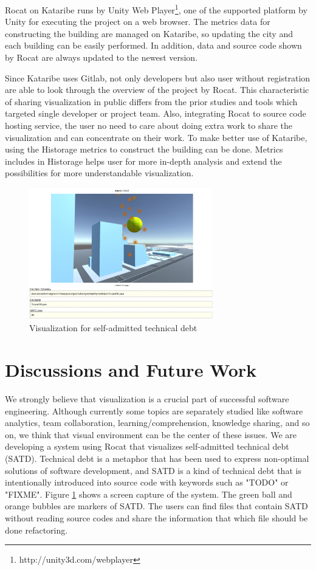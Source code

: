 \documentclass[conference]{IEEEtran}
\newcommand{\figref}[1]{Figure \ref{#1}}
\begin{document}
Rocat on Kataribe runs by Unity Web Player\footnote{http://unity3d.com/webplayer}, one of the supported platform by Unity for executing the project on a web browser.
The metrics data for constructing the building are managed on Kataribe, so updating the city and each building can be easily performed.
In addition, data and source code shown by Rocat are always updated to the newest version.

Since Kataribe uses Gitlab, not only developers but also user without registration are able to look through the overview of the project by Rocat.
This characteristic of sharing visualization in public differs from the prior studies and tools which targeted single developer or project team.
Also, integrating Rocat to source code hosting service, the user no need to care about doing extra work to share the visualization and can concentrate on their work.
To make better use of Kataribe, using the Historage metrics to construct the building can be done.
Metrics includes in Historage helps user for more in-depth analysis and extend the possibilities for more understandable visualization.


\begin{figure}[tb]
\centering
\includegraphics[width=8cm]{satd.pdf}
\caption{Visualization for self-admitted technical debt}
\label{figure:SATD}
\end{figure}

\section{Discussions and Future Work}
We strongly believe that visualization is a crucial part of successful software engineering.
Although currently some topics are separately studied like software analytics, team collaboration, learning/comprehension, knowledge sharing, and so on, we think that visual environment can be the center of these issues.
We are developing a system using Rocat that visualizes self-admitted technical debt (SATD).
Technical debt is a metaphor that has been used to express non-optimal solutions of software development, and SATD is a kind of technical debt that is intentionally introduced into source code with keywords such as "TODO" or "FIXME".
\figref{figure:SATD} shows a screen capture of the system.
The green ball and orange bubbles are markers of SATD.
The users can find files that contain SATD without reading source codes and share the information that which file should be done refactoring.
\end{document}
